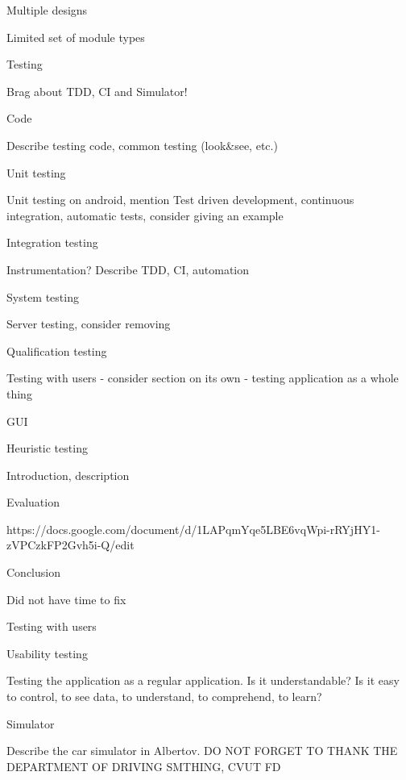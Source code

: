 \secc Multiple designs

Limited set of module types

\chap Testing

Brag about TDD, CI and Simulator!

\sec Code

Describe testing code, common testing (look&see, etc.)

\secc Unit testing

Unit testing on android, mention Test driven development, continuous integration, automatic tests, consider giving an example

\secc Integration testing

Instrumentation? Describe TDD, CI, automation

\secc System testing

Server testing, consider removing

\secc Qualification testing

Testing with users - consider section on its own - testing application as a whole thing

\sec GUI


\secc Heuristic testing

Introduction, description

\seccc Evaluation

https://docs.google.com/document/d/1LAPqmYqe5LBE6vqWpi-rRYjHY1-zVPCzkFP2Gvh5i-Q/edit

\seccc Conclusion

Did not have time to fix

\secc Testing with users


\seccc Usability testing

Testing the application as a regular application. Is it understandable? Is it easy to control, to see data, to understand, to comprehend, to learn?


\seccc Simulator

Describe the car simulator in Albertov.
DO NOT FORGET TO THANK THE DEPARTMENT OF DRIVING SMTHING, CVUT FD


